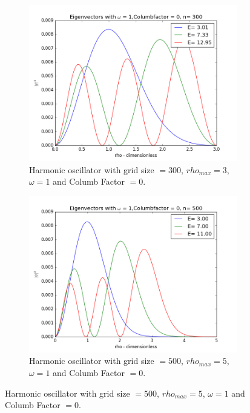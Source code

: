 \documentclass[a4paper,11pt]{article}
\begin{document}
{\begin{figure}
	\centering
	\begin{subfigure}[b]{0.4\textwidth}
		\includegraphics[scale=0.4]{ok_test1_WR=1_CF=0_C=300_rhostop=3}
		\caption{Harmonic oscillator with grid size $=300$, $rho_{max}=3$, $\omega=1$ and Columb Factor $=0$. }
		\label{fig:test1}
	\end{subfigure}
	\begin{subfigure}[b]{0.4\textwidth}
		\includegraphics[scale=0.4]{ok_Project_2_Wr=1_Columb_factor=0_n=500_rho_stop=5}
		\caption{Harmonic oscillator with grid size $=500$, $rho_{max}=5$, $\omega=1$ and Columb Factor $=0$. }
		\label{fig:goodtest1}
	\end{subfigure}
\end{figure}

}
\end{document}

